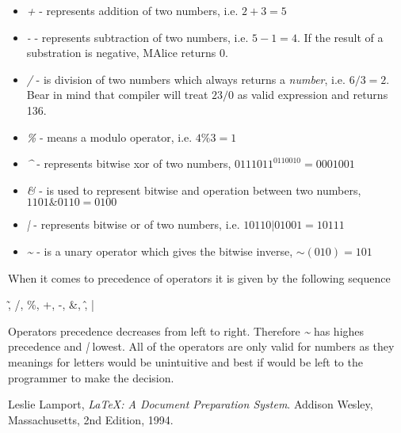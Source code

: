\documentclass[a4wide, 11pt]{article}
\begin{document}
\begin{itemize}

    \item
    \textit{+} - represents addition of two numbers, i.e. $ 2 + 3 = 5 $

    \item
    \textit{-} - represents subtraction of two numbers, i.e. $ 5 - 1 = 4 $. If the result of a substration is negative, MAlice returns 0.

    \item
    \textit{/} - is division of two numbers which always returns a \emph{number}, i.e. $ 6 / 3 = 2 $. Bear in mind that compiler will treat $ 23 / 0 $ as valid expression and returns 136.

    \item
    \textit{\%} - means a modulo operator, i.e. $ 4 \% 3 = 1 $

    \item
    \textit{\^} - represents bitwise xor of two numbers, $ 0111011 ^ 0110010 = 0001001 $

    \item
    \textit{\&} - is used to represent bitwise and operation between two numbers,  $ 1101 \& 0110 = 0100 $

    \item
    \textit{|} - represents bitwise or of two numbers, i.e. $ 10110 | 01001 = 10111 $

    \item
    \textit{\~} - is a unary operator which gives the bitwise inverse, $ \sim(010) = 101 $
    
\end{itemize}

When it comes to precedence of operators it is given by the following sequence

\begin{center} \~, /, \%, +, -, \&, \^, | \end{center}

Operators precedence decreases from left to right. Therefore \emph{\~} has highes precedence and \emph{|} lowest.
All of the operators are only valid for numbers as they meanings for letters would be unintuitive and best if would be left to the programmer to make the decision.


\begin{thebibliography}{9}

  Leslie Lamport,
  \emph{\LaTeX: A Document Preparation System}.
  Addison Wesley, Massachusetts,
  2nd Edition,
  1994.

\end{thebibliography}
\end{document}
